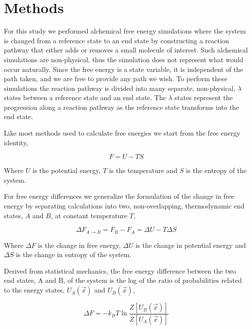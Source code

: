 \section{Methods}

For this study we performed alchemical free energy simulations where the system is changed from a reference state to an end state by constructing a reaction pathway that either adds or removes a small molecule of interest. Such alchemical simulations are non-physical, thus the simulation does not represent what would occur naturally. Since the free energy is a state variable, it is independent of the path taken, and we are free to provide any path we wish. To perform these simulations the reaction pathway is divided into many separate, non-physical, $\lambda$ states between a reference state and an end state. The $\lambda$ states represent the progression along a reaction pathway as the reference state transforms into the end state. 

Like most methods used to calculate free energies we start from the free energy identity,

\begin{equation}\label{eq:free_id}
    F = U - TS
\end{equation}

Where $U$ is the potential energy, $T$ is the temperature and $S$ is the entropy of the system.

For free energy differences we generalize the formulation of the change in free energy by separating calculations into two, non-overlapping, thermodynamic end states, $A$ and $B$, at constant temperature $T$,

\begin{equation}
    \Delta F_{A \rightarrow B} = F_{B} - F_{A}= \Delta U - T \Delta S
\end{equation}

Where $\Delta F$ is the change in free energy, $\Delta U$ is the change in potential energy and $\Delta S$ is the change in entropy of the system.

Derived from statistical mechanics, the free energy difference between the two end states, A and B, of the system is the log of the ratio of probabilities related to the energy states, $U_{A}(\vec{x})$ and $U_{B}(\vec{x})$,

\begin{equation}\label{eq:free}
    \Delta F = -k_{B}T \ln{\frac{Z[U_{B}(\vec{x})]}{Z[U_{A}(\vec{x})]}}
\end{equation}

